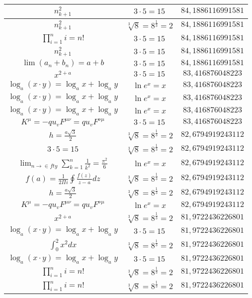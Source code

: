 \documentclass{article}
\begin{document}
\begin{flushleft}
\begin{longtable}{|c|c|c|}
$n_{k+1}^2$ & $3\cdot 5=15$ & $84,1886116991581$ \\ \hline 
$n_{k+1}^2$ & $\sqrt[3]{8}=8^{\frac{1}{3}}=2$ & $84,1886116991581$ \\ \hline 
$\prod_{i=1}^ni=n!$ & $3\cdot 5=15$ & $84,1886116991581$ \\ \hline 
$n_{k+1}^2$ & $3\cdot 5=15$ & $84,1886116991581$ \\ \hline 
$\lim\left(a_n+b_n\right)=a+b$ & $3\cdot 5=15$ & $84,1886116991581$ \\ \hline 
$x^{2+a}$ & $3\cdot 5=15$ & $83,416876048223$ \\ \hline 
$\log_{a}(x\cdot y)=\log_{a}x+\log_{a}y$ & $\ln e^x=x$ & $83,416876048223$ \\ \hline 
$\log_{a}(x\cdot y)=\log_{a}x+\log_{a}y$ & $\ln e^x=x$ & $83,416876048223$ \\ \hline 
$\log_{a}(x\cdot y)=\log_{a}x+\log_{a}y$ & $\ln e^x=x$ & $83,416876048223$ \\ \hline 
$K^\mu=-qu_vF^{\mu\nu}=qu_vF^{\nu\mu}$ & $3\cdot 5=15$ & $83,416876048223$ \\ \hline 
$h=\frac{a\sqrt{3}}{2}$ & $\sqrt[3]{8}=8^{\frac{1}{3}}=2$ & $82,6794919243112$ \\ \hline 
$3\cdot 5=15$ & $\sqrt[3]{8}=8^{\frac{1}{3}}=2$ & $82,6794919243112$ \\ \hline 
$\lim_{n\to\in fty}\sum_{k=1}^n\frac{1}{k^2}=\frac{\pi^2}{6}$ & $\ln e^x=x$ & $82,6794919243112$ \\ \hline 
$f\left(a\right)=\frac{1}{2\Pi i}\oint\frac{f\left(z\right)}{z-a}dz$ & $\sqrt[3]{8}=8^{\frac{1}{3}}=2$ & $82,6794919243112$ \\ \hline 
$h=\frac{a\sqrt{3}}{2}$ & $\sqrt[3]{8}=8^{\frac{1}{3}}=2$ & $82,6794919243112$ \\ \hline 
$K^\mu=-qu_vF^{\mu\nu}=qu_vF^{\nu\mu}$ & $\ln e^x=x$ & $82,6794919243112$ \\ \hline 
$x^{2+a}$ & $\sqrt[3]{8}=8^{\frac{1}{3}}=2$ & $81,9722436226801$ \\ \hline 
$\log_{a}(x\cdot y)=\log_{a}x+\log_{a}y$ & $3\cdot 5=15$ & $81,9722436226801$ \\ \hline 
$\int _0^2x^2dx$ & $\sqrt[3]{8}=8^{\frac{1}{3}}=2$ & $81,9722436226801$ \\ \hline 
$\log_{a}(x\cdot y)=\log_{a}x+\log_{a}y$ & $3\cdot 5=15$ & $81,9722436226801$ \\ \hline 
$\prod_{i=1}^ni=n!$ & $\sqrt[3]{8}=8^{\frac{1}{3}}=2$ & $81,9722436226801$ \\ \hline 
$\prod_{i=1}^ni=n!$ & $\sqrt[3]{8}=8^{\frac{1}{3}}=2$ & $81,9722436226801$ \\ \hline 

\end{longtable}
\end{flushleft}
\end{document}

